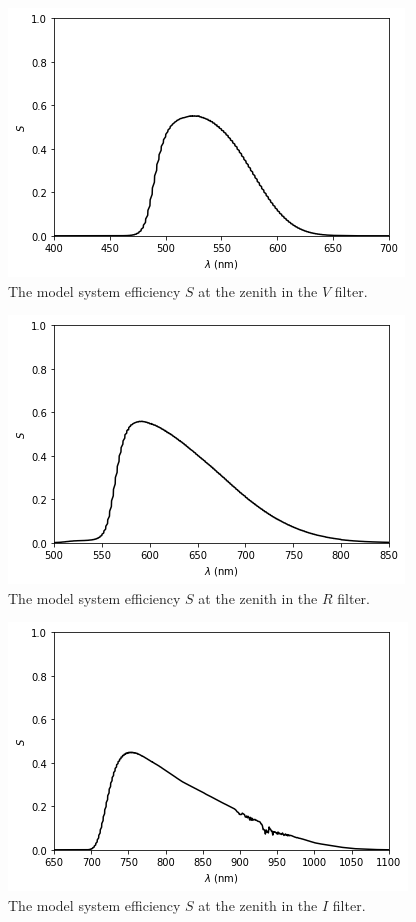\begin{figure}
\begin{center}
\includegraphics[width=0.7\linewidth]{figures/huitzi-f20-S-JC-V.png}
\medskip
\caption{The model system efficiency $S$ at the zenith in the $V$ filter.}
\end{center}
\end{figure}

\begin{figure}
\begin{center}
\includegraphics[width=0.7\linewidth]{figures/huitzi-f20-S-JC-R.png}
\medskip
\caption{The model system efficiency $S$ at the zenith in the $R$ filter.}
\end{center}
\end{figure}

\begin{figure}
\begin{center}
\includegraphics[width=0.7\linewidth]{figures/huitzi-f20-S-JC-I.png}
\medskip
\caption{The model system efficiency $S$ at the zenith in the $I$ filter.}
\end{center}
\end{figure}

